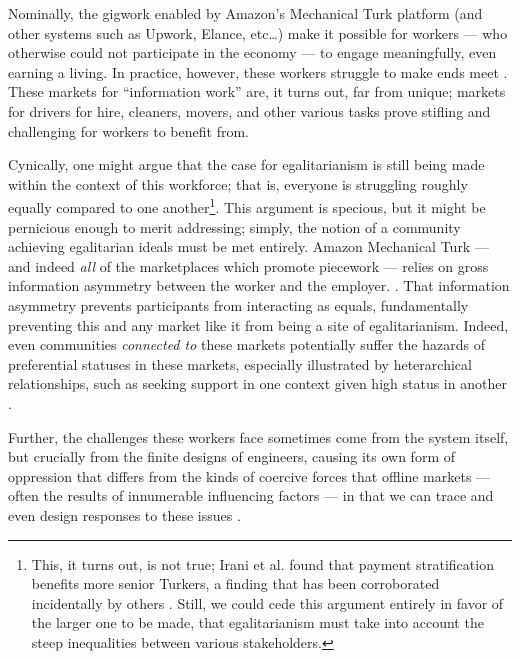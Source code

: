 \documentclass[11pt,titlepage]{article}
\begin{document}
Nominally, the gigwork enabled by Amazon's Mechanical Turk platform
(and other systems such as Upwork, Elance, etc\dots) make it possible for workers
--- who otherwise could not participate in the economy ---
to engage meaningfully, even earning a living.
In practice, however, these workers struggle to make ends meet
\cite{Ross}.
These markets for ``information work'' are, it turns out, far from unique;
markets for drivers for hire, cleaners, movers, and other various tasks
prove stifling and challenging for workers to benefit from.

Cynically,
one might argue that
the case for egalitarianism is still being made within the context of this workforce;
that is, everyone is struggling roughly equally compared to one another\footnote{This,
it turns out, is not true;
Irani et al. found that payment stratification benefits more senior Turkers,
a finding that has been corroborated incidentally by others
\cite{turkopticon}.
Still, we could cede this argument entirely in favor of the larger one to be made,
that egalitarianism must take into account the steep inequalities between various stakeholders.}.
This argument is specious, but it might be pernicious enough to merit addressing;
simply, the notion of a community achieving egalitarian ideals must be met entirely.
Amazon Mechanical Turk
--- and indeed \textit{all} of the marketplaces which promote piecework ---
relies on gross information asymmetry between the worker and the employer.
\cite{turkopticon,professionalCrowdworkEthics}.
That information asymmetry prevents participants from interacting as equals,
fundamentally preventing this and any market like it from being a site of egalitarianism.
Indeed, even communities \textit{connected to} these markets potentially suffer the hazards of
preferential statuses in these markets, especially illustrated by heterarchical relationships,
such as seeking support in one context given high status in another
\cite{dynamo}.


Further, the challenges these workers face sometimes come from the system itself,
but crucially from the finite designs of engineers,
causing its own form of oppression that differs from the kinds of coercive forces that offline markets
--- often the results of innumerable influencing factors ---
in that we can trace and even design responses to these issues
\cite{uberAlgorithm,turkopticon}.
\end{document}
